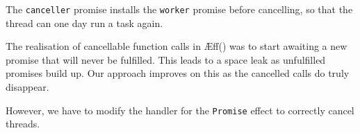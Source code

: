 \documentclass[msc,deptreport,cs]{infthesis} %
\newcommand{\code}[1]{\lstinline{#1}}
\newcommand{\texthighlight}[1]{%
  \colorbox{red!20}{#1}}
\newcommand{\greytext}[1]{\textcolor{black!40}{#1}}
\newcommand\aeff{{\AE}ff\xspace}
\newcommand{\todo}[1]
           {{\par\noindent\small\color{RoyalPurple}
  \framebox{\parbox{\dimexpr\linewidth-2\fboxsep-2\fboxrule}
    {\textbf{TODO:} #1}}}}
\begin{document}
\noindent The \code{canceller} promise installs the \code{worker} promise before
cancelling, so that the thread can one day run a task again. \todo{fix}


The realisation of cancellable function calls in
\aeff(\cite{ahman2020asynchronous}) was to start awaiting a new promise that
will never be fulfilled. This leads to a space leak as unfulfilled promises
build up. Our approach improves on this as the cancelled calls do truly
disappear.


However, we have to modify the handler for the \code{Promise} effect to
correctly cancel threads.



\end{document}
